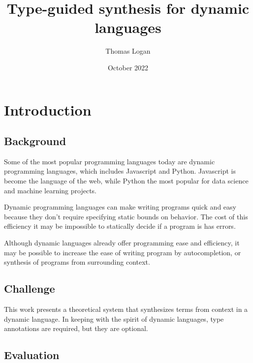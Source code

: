 \documentclass[]{acmart}
\title{Type-guided synthesis for dynamic languages}
\author{Thomas Logan}
\date{October 2022}
\begin{document}
\maketitle

\section{Introduction}
\subsection*{Background}
Some of the most popular programming languages today are 
dynamic programming languages, which includes Javascript and Python. 
Javascript is become the language of the web, while Python the most popular
for data science and machine learning projects. 

Dynamic programming languages can make writing programs quick and easy 
because they don't require specifying static bounds on behavior.
The cost of this efficiency it may be impossible to statically decide 
if a program is has errors.  

Although dynamic languages already offer programming ease and efficiency, it
may be possible to increase the ease of writing program by autocompletion,
or synthesis of programs from surrounding context. 

\subsection*{Challenge}
This work presents a theoretical system that synthesizes terms from context 
in a dynamic language. In keeping with the spirit of dynamic languages, 
type annotations are required, but they are optional. 

\subsection*{Evaluation}







\end{document}
